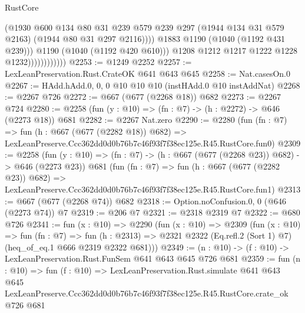 \begin{lexlean}{RustCore}
\begin{coremodule}
                                    (@1930
                                      @600
                                      @134
                                      @80
                                      @31
                                      @239
                                      @579
                                      @239
                                      @297
                                      (@1944 @134 @31 @579 @2163)
                                      (@1944 @80 @31 @297 @2116))))
                                @1883
                                @1190
                                (@1040 (@1192 @431 @239)))
                              @1190
                              (@1040 (@1192 @420 @610)))
                            @1208
                            @1212
                            @1217
                            @1222
                            @1228
                            @1232))))))))))))
@2253 := @1249 @2252
@2257 := LexLeanPreservation.Rust.CrateOK @641 @643 @645
@2258 := Nat.casesOn.{0}
@2267 := HAdd.hAdd.{0, 0, 0} @10 @10 @10 (instHAdd.{0} @10 instAddNat)
@2268 := @2267 @726
@2272 := @667 (@677 (@2268 @18)) @682
@2273 := @2267 @724
@2280 := @2258 (fun (y : @10) => (fn : @7) -> (h : @2272) -> @646 (@2273 @18)) @681
@2282 := @2267 Nat.zero
@2290 := @2280
    (fun (fn : @7) =>
    fun (h : @667 (@677 (@2282 @18)) @682) =>
    LexLeanPreserve.Ccc362dd0d0b76b7c46f93f7f38ec125e.R45.RustCore.fun0)
@2309 := @2258
    (fun (y : @10) => (fn : @7) -> (h : @667 (@677 (@2268 @23)) @682) -> @646 (@2273 @23))
    @681
    (fun (fn : @7) =>
    fun (h : @667 (@677 (@2282 @23)) @682) =>
    LexLeanPreserve.Ccc362dd0d0b76b7c46f93f7f38ec125e.R45.RustCore.fun1)
@2313 := @667 (@677 (@2268 @74)) @682
@2318 := Option.noConfusion.{0, 0} (@646 (@2273 @74)) @7
@2319 := @206 @7
@2321 := @2318 @2319 @7
@2322 := @680 @726
@2341 := fun (x : @10) =>
  @2290
    (fun (x : @10) =>
    @2309
      (fun (x : @10) =>
      fun (fn : @7) =>
      fun (h : @2313) =>
      @2321 @2322 (Eq.refl.{2} (Sort 1) @7) (heq_of_eq.{1} @666 @2319 @2322 @681)))
@2349 := (n : @10) -> (f : @10) -> LexLeanPreservation.Rust.FunSem @641 @643 @645 @726 @681
@2359 := fun (n : @10) =>
  fun (f : @10) =>
  LexLeanPreservation.Rust.simulate
    @641
    @643
    @645
    LexLeanPreserve.Ccc362dd0d0b76b7c46f93f7f38ec125e.R45.RustCore.crate_ok
    @726
    @681
\end{coremodule}
\end{lexlean}
